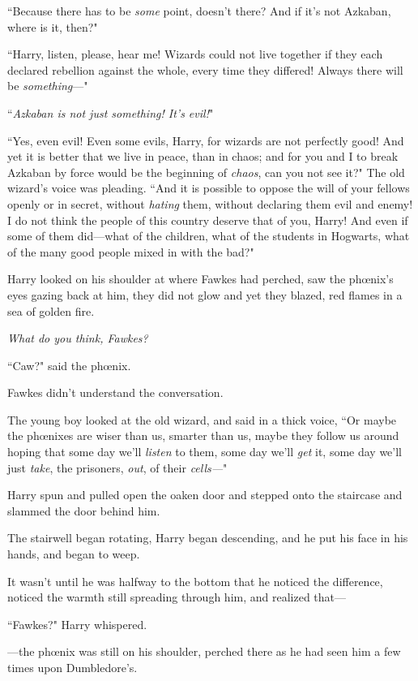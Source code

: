 ``Because there has to be \emph{some} point, doesn't there? And if it's not Azkaban, where is it, then?"

``Harry, listen, please, hear me! Wizards could not live together if they each declared rebellion against the whole, every time they differed! Always there will be \emph{something}—"

``\emph{Azkaban is not just something! It's evil!}"

``Yes, even evil! Even some evils, Harry, for wizards are not perfectly good! And yet it is better that we live in peace, than in chaos; and for you and I to break Azkaban by force would be the beginning of \emph{chaos}, can you not see it?" The old wizard's voice was pleading. ``And it is possible to oppose the will of your fellows openly or in secret, without \emph{hating} them, without declaring them evil and enemy! I do not think the people of this country deserve that of you, Harry! And even if some of them did—what of the children, what of the students in Hogwarts, what of the many good people mixed in with the bad?"

Harry looked on his shoulder at where Fawkes had perched, saw the phœnix's eyes gazing back at him, they did not glow and yet they blazed, red flames in a sea of golden fire.

\emph{What do you think, Fawkes?}

``Caw?" said the phœnix.

Fawkes didn't understand the conversation.

The young boy looked at the old wizard, and said in a thick voice, ``Or maybe the phœnixes are wiser than us, smarter than us, maybe they follow us around hoping that some day we'll \emph{listen} to them, some day we'll \emph{get} it, some day we'll just \emph{take}, the prisoners, \emph{out}, of their \emph{cells—}"

Harry spun and pulled open the oaken door and stepped onto the staircase and slammed the door behind him.

The stairwell began rotating, Harry began descending, and he put his face in his hands, and began to weep.

It wasn't until he was halfway to the bottom that he noticed the difference, noticed the warmth still spreading through him, and realized that—

``Fawkes?" Harry whispered.

—the phœnix was still on his shoulder, perched there as he had seen him a few times upon Dumbledore's.

